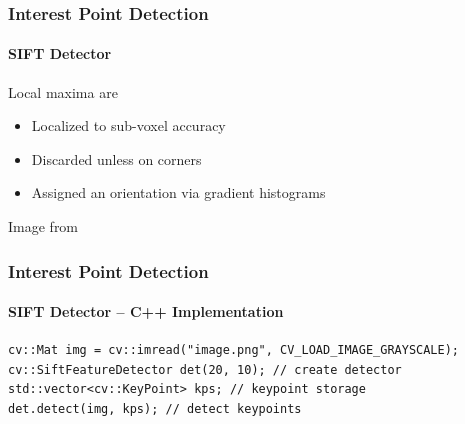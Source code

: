\documentclass[xetex,professionalfont]{beamer}
\begin{document}

\begin{frame}
\frametitle{Interest Point Detection}
\framesubtitle{SIFT Detector}

Local maxima are
\begin{itemize}
	\item Localized to sub-voxel accuracy %
	\item Discarded unless on corners %
	\item Assigned an orientation via gradient histograms %
\end{itemize}

\begin{center}
	{\centering Image from \cite{prince12}}
\end{center}

\end{frame}


\begin{frame}[fragile]
\frametitle{Interest Point Detection}
\framesubtitle{SIFT Detector -- C++ Implementation}


\begin{verbatim}
cv::Mat img = cv::imread("image.png", CV_LOAD_IMAGE_GRAYSCALE);
cv::SiftFeatureDetector det(20, 10); // create detector
std::vector<cv::KeyPoint> kps; // keypoint storage
det.detect(img, kps); // detect keypoints
\end{verbatim}

\end{frame}
\end{document}
